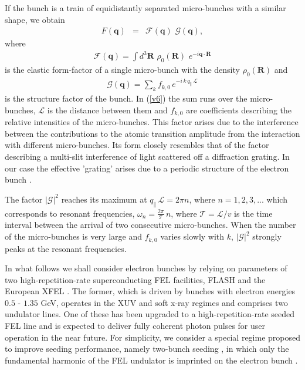 \documentclass[prl, twocolumn, floatfix]{revtex4}
\begin{document}
If the bunch is a train of equidistantly separated
micro-bunches with a similar shape, we obtain
\begin{eqnarray}
F(\bm q)  & = & \mathcal{F}(\bm q)  \, \,  \mathcal{G}(\bm q),
\label{v4}
\end{eqnarray}
where
\begin{eqnarray}
\mathcal{F}(\bm q) = \int \!\!d^3 {\bm R } \, \,
\rho_0( \bm R) \, \,
e^{ - i \bm q \cdot \bm R }
\label{v5}
\end{eqnarray}
is the elastic form-factor of a single micro-bunch
with the density $ \rho_0( \bm R) $ and
\begin{eqnarray}
\mathcal{G}(\bm q) = \sum_{ k } f_{k,0} \, e^{ - i \, k \, q_\parallel \, \mathcal{L}}
\label{v6}
\end{eqnarray}
is the structure factor of the bunch. In (\ref{v6})
the sum runs over the micro-bunches, $\mathcal{L}$
is the distance between them and
$f_{k,0}$ are coefficients
describing the relative intensities of the micro-bunches.
This factor arises due to the interference
between the contributions to the atomic transition
amplitude from the interaction with different micro-bunches.
Its form closely resembles that of the factor describing
a multi-slit interference of light scattered off a diffraction grating.
In our case the effective 'grating' arises due to a periodic structure
of the electron bunch \cite{rest-frame}.

The factor $ \vert \mathcal{G} \vert^2 $ reaches its maximum
at $ q_\parallel \, \mathcal{L} = 2 \pi n$, where
$n = 1, 2, 3, ...$ which corresponds to resonant frequencies,
$ \omega_{n} = \frac{2 \pi }{ \mathcal{T} } \, n$, where
$ \mathcal{T}  = \mathcal{ L }/v $
is the time interval between the arrival of two consecutive micro-bunches.
When the number of the  micro-bunches is very large and
$f_{k,0}$ varies slowly with $k$, $ \vert \mathcal{G} \vert^2 $ strongly peaks at
the resonant frequencies.

\vspace{0.25cm}

In what follows we shall consider electron bunches by relying on
parameters of two high-repetition-rate superconducting FEL facilities,
FLASH \cite{FLASH} and the European XFEL \cite{EuXFEL}.
The former, which is driven by bunches with electron energies $ 0.5$ - $1.35$ GeV,  operates in the XUV and soft x-ray regimes and comprises two undulator lines.
One of these has been upgraded to a high-repetition-rate seeded FEL line \cite{high-rep}
and is expected to deliver fully coherent photon pulses for user operation in the near future.
For simplicity, we consider a special regime
proposed to improve seeding performance,
namely two-bunch seeding \cite{two-bunch-seed},
in which only the fundamental harmonic
of the FEL undulator is imprinted
on the electron bunch \cite{many-harmon}.
\end{document}
